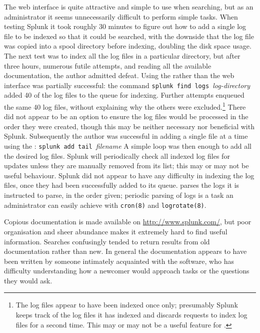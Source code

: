 The web interface is quite attractive and simple to use when searching, but
as an administrator it seems unnecessarily difficult to perform simple
tasks.  When testing Splunk it took roughly 30 minutes to figure out how to
add a single log file to be indexed so that it could be searched, with the
downside that the log file was copied into a spool directory before
indexing, doubling the disk space usage.  The next test was to index all
the log files in a particular directory, but after three hours, numerous
futile attempts, and reading all the available documentation, the author
admitted defeat.  Using the  rather than the web interface was
partially successful: the command \newline{} \tab{} \texttt{splunk find
logs }\textit{log-directory\/}\newline{} added 40 of the
\numberOFlogFILES{} log files to the queue for indexing.  Further attempts
enqueued the same 40 log files, without explaining why the others were
excluded.\footnote{The log files appear to have been indexed once only;
presumably Splunk keeps track of the log files it has indexed and discards
requests to index log files for a second time.  This may or may not be a
useful feature for \parsername{}.} There did not appear to be an option to
ensure the log files would be processed in the order they were created,
though this may be neither necessary nor beneficial with Splunk.
Subsequently the author was successful in adding a single file at a time
using the :\newline{} \tab{} \texttt{splunk add tail
}\textit{filename\/}\newline{} A simple loop was then enough to add all the
desired log files.  Splunk will periodically check all indexed log files
for updates unless they are manually removed from its list; this may or may
not be useful behaviour.  Splunk did not appear to have any difficulty in
indexing the log files, once they had been successfully added to its queue.
\parsername{} parses the logs it is instructed to parse, in the order
given; periodic parsing of logs is a task an administrator can easily
achieve with \texttt{cron(8)} and \texttt{logrotate(8)}.

Copious documentation is made available on \url{http://www.splunk.com/},
but poor organisation and sheer abundance makes it extremely hard to find
useful information.  Searches confusingly tended to return results from old
documentation rather than new.  In general the documentation appears to
have been written by someone intimately acquainted with the software, who
has difficulty understanding how a newcomer would approach tasks or the
questions they would ask.


